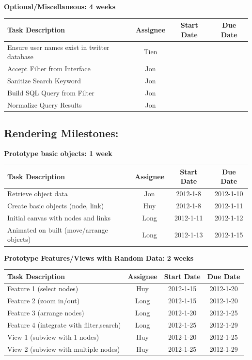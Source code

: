 \documentclass[12pt, letterpaper]{article}
\begin{document}
  \begin{center}
		{\bf Optional/Miscellaneous: 4 weeks}
    \begin{tabular}{| p{8.3cm} || c | c | c | }
      \hline
      Task Description & Assignee & Start Date & Due Date \\
      \hline
			Ensure user names exist in twitter database & Tien & & \\
	    Accept Filter from Interface & Jon & & \\
	    Sanitize Search Keyword & Jon & & \\
	    Build SQL Query from Filter & Jon & & \\
      Normalize Query Results & Jon & & \\
      \hline
    \end{tabular}
  \end{center}
  
\subsection{Rendering Milestones:}

  \begin{center}
		{\bf Prototype basic objects: 1 week}
    \begin{tabular}{| p{8.3cm} || c | c | c | }
      \hline
      Task Description & Assignee & Start Date & Due Date \\
      \hline
			Retrieve object data & Jon & 2012-1-8 & 2012-1-10 \\
	    Create basic objects (node, link)& Huy & 2012-1-8 & 2012-1-11 \\
			Initial canvas with nodes and links & Long & 2012-1-11 & 2012-1-12 \\
	    Animated on built (move/arrange objects) & Long & 2012-1-13 & 2012-1-15 \\
      \hline
    \end{tabular}
  \end{center}

\begin{center}
		{\bf Prototype Features/Views with Random Data: 2 weeks}
    \begin{tabular}{| p{8.3cm} || c | c | c | }
      \hline
      Task Description & Assignee & Start Date & Due Date \\
      \hline
	    Feature 1 (select nodes) & Huy & 2012-1-15 & 2012-1-20 \\
	    Feature 2 (zoom in/out)  & Long & 2012-1-15 & 2012-1-20 \\
	    Feature 3 (arrange nodes)  & Long & 2012-1-20 & 2012-1-25 \\
	    Feature 4 (integrate with filter,search)  & Long & 2012-1-25 & 2012-1-29 \\
            View 1 (subview with 1 nodes)  & Huy & 2012-1-20 & 2012-1-25 \\
	    View 2 (subview with multiple nodes)  & Huy & 2012-1-25 & 2012-1-29 \\
      \hline
    \end{tabular}
  \end{center}
\end{document}
